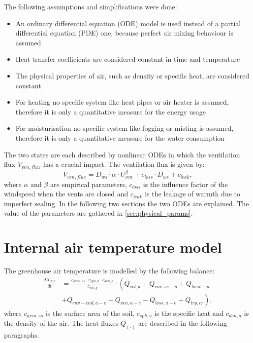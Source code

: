 The following assumptions and simplifications were done:
\begin{itemize}
	\item An ordinary differential equation (ODE) model is used instead of a partial differential equation (PDE) one, because perfect air mixing behaviour is assumed
	\item Heat transfer coefficients are considered constant in time and temperature
	\item The physical properties of air, such as density or specific heat, are considered constant
	\item For heating no specific system like heat pipes or air heater is assumed, therefore it is only a quantitative measure for the energy usage
	\item For moisturisation no specific system like fogging or misting is assumed, therefore it is only a quantitative measure for the water consumption
\end{itemize}

The two states are each described by nonlinear ODEs in which the ventilation flux $V_{ven,flux}$ has a crucial impact.
The ventilation flux is given by:
\begin{equation}\label{eq:venflux}
V_{ven,flux} = D_{ws} \cdot \alpha \cdot U_{ven}^\beta + c_{loss} \cdot D_{ws} + c_{leak},
\end{equation} 
where $\alpha$ and $\beta$ are empirical parameters, $c_{loss}$ is the influence factor of the windspeed when the vents are closed and $c_{leak}$ is the leakage of warmth due to imperfect sealing.
In the following two sections the two ODEs are explained.
The value of the parameters are gathered in \cref{sec:physical_params}.
\section{Internal air temperature model}
\label{sec:temp}
The greenhouse air temperature is modelled by the following balance:
\begin{equation}\label{eq:temp}
\begin{split}
\frac{dX_{T,a}}{dt} &= \frac{c_{area,ss} \cdot c_{sph,a} \cdot c_{den,a}}{c_{vol,g}} \cdot \left(Q_{sol,a} + Q_{cnv,ss-a} + Q_{heat-a} \right.\\
		& \left. + Q_{cnv-cnd,a-e} - Q_{ven,a-e} - Q_{loss,a-e} - Q_{trp,cr}\right),
\end{split}
\end{equation}
where $c_{area,ss}$ is the surface area of the soil, $c_{sph,a}$ is the specific heat and $c_{den,a}$ is the density of the air.
The heat fluxes $Q_{(\cdot)}$ are described in the following paragraphs.


